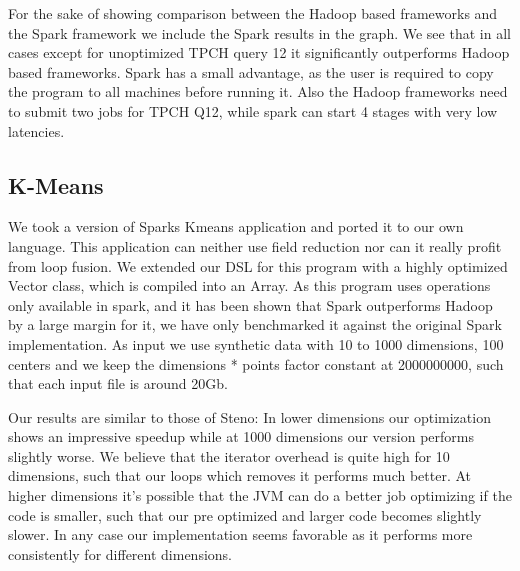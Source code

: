 For the sake of showing comparison between the Hadoop based frameworks and the Spark framework we include the Spark results in the graph. We see that in all cases except for unoptimized TPCH query 12 it significantly outperforms Hadoop based frameworks.  Spark has a small advantage, as the user is required to copy the program to all machines before running it. Also the Hadoop frameworks need to submit two jobs for TPCH Q12, while spark can start 4 stages with very low latencies.

\subsection{K-Means}
\label{subsec:kmeans}
We took a version of Sparks Kmeans application and ported it to our own language. This application can neither use field reduction nor can it really profit from loop fusion. We extended our DSL for this program with a highly optimized Vector class, which is compiled into an Array. As this program uses operations only available in spark, and it has been shown that Spark outperforms Hadoop by a large margin for it, we have only benchmarked it against the original Spark implementation. As input we use synthetic data with 10 to 1000 dimensions, 100 centers and we keep the dimensions * points factor constant at 2000000000, such that each input file is around 20Gb. 

Our results are similar to those of Steno: In lower dimensions our optimization shows an impressive speedup while at 1000 dimensions our version performs slightly worse. We believe that the iterator overhead is quite high for 10 dimensions, such that our loops which removes it performs much better. At higher dimensions it's possible that the JVM can do a better job optimizing if the code is smaller, such that our pre optimized and larger code becomes slightly slower. In any case our implementation seems favorable as it performs more consistently for different dimensions.

